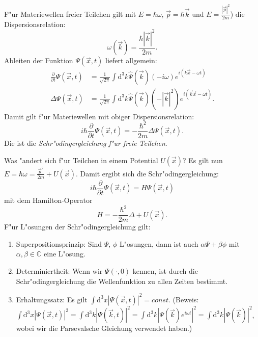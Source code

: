 F"ur Materiewellen freier Teilchen
gilt mit $E=\hbar \omega$, $\vec p = \hbar \vec k$ und
$E = \frac{|\vec p|^2}{2m}$) die Dispersionsrelation:
\begin{equation}
	\omega(\vec k) = \frac{\hbar |\vec k|^2}{2m}.
\end{equation}
Ableiten der Funktion $\Psi(\vec x,t)$ liefert allgemein:
\begin{align}
	\frac{\partial }{\partial  t} \Psi(\vec x,t) &= 
	\frac{1}{\sqrt{2\pi}}\int \mathrm{d}^3k
        \hat \Psi(\vec k) (-i\omega)
        e^{i(k \vec x -\omega t)}\\
	\Delta \Psi(\vec x,t) &= \frac{1}{\sqrt{2\pi}}\int \mathrm{d}^3k
        \hat \Psi(\vec k) (-|\vec k|^2)
        e^{i(\vec k \vec x -\omega t)}.
\end{align}
Damit gilt f"ur Materiewellen mit obiger Dispersionsrelation:
\begin{equation}
	i\hbar \frac{\partial }{\partial  t} \Psi(\vec x,t)
	= - \frac{\hbar^2}{2m} \Delta \Psi(\vec x,t).
\end{equation}
Die ist die \emph{Schr"odingergleichung f"ur freie Teilchen}.

Was "andert sich f"ur Teilchen in einem Potential $U(\vec x)$?
Es gilt nun $E=\hbar \omega= \frac{\vec p^2}{2m} + U(\vec x)$. Damit
ergibt sich die Schr"odingergleichung:
\begin{equation}
	i\hbar \frac{\partial }{\partial  t} \Psi(\vec x,t)
	= H \Psi(\vec x,t)
\end{equation}
mit dem Hamilton-Operator
\begin{equation}
	H = - \frac{\hbar^2}{2m}\Delta + U(\vec x).
\end{equation}
F"ur L"osungen der Schr"odingergleichung gilt:
\begin{enumerate}
	\item Superpositionsprinzip: Sind $\Psi$, $\phi$ L"osungen,
	dann ist auch $\alpha \Psi + \beta \phi$ mit $\alpha,
	\beta  \in \mathbb{C}$ eine L"osung.
	\item Determiniertheit: Wenn wir $\Psi(\cdot,0)$ kennen, ist
	durch die Schr"odingergleichung die Wellenfunktion zu allen
	Zeiten bestimmt.
	\item Erhaltungssatz: Es gilt $\int \mathrm{d}^3 x
	|\Psi(\vec x,t)|^2 = const.$ (Beweis:
	$\int \mathrm{d}^3 x
        |\Psi(\vec x,t)|^2 = \int \mathrm{d}^3 k
        |\Psi(\vec k,t)|^2 = \int \mathrm{d}^3 k
        |\Psi(\vec k)e^{i\omega t}|^2 = \int \mathrm{d}^3 k
        |\Psi(\vec k)|^2$, wobei wir die Parsevalsche Gleichung verwendet
	haben.)	 
\end{enumerate}

